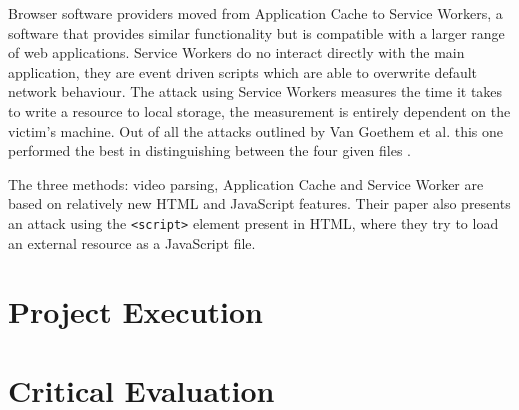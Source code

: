 \documentclass[10pt,a4paper,twoside]{book}
\begin{document}
Browser software providers moved from Application Cache to Service Workers, a software that provides similar functionality but is compatible with a larger range of web applications. Service Workers do no interact directly with the main application, they are event driven scripts which are able to overwrite default network behaviour. The attack using Service Workers measures the time it takes to write a resource to local storage, the measurement is entirely dependent on the victim's machine. Out of all the attacks outlined by Van Goethem et al. this one performed the best in distinguishing between the four given files \cite{van2015clock}.

The three methods: video parsing, Application Cache and Service Worker are based on relatively new HTML and JavaScript features. Their paper also presents an attack using the \texttt{<script>} element present in HTML, where they try to load an external resource as a JavaScript file. 

 


\chapter{Project Execution}
\label{chap:execution}












\chapter{Critical Evaluation}
\label{chap:evaluation}
\end{document}
